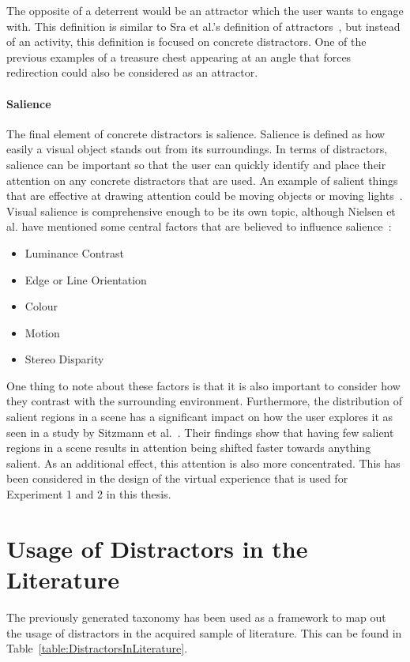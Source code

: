 The opposite of a deterrent would be an attractor which the user wants to engage with. This definition is similar to Sra et al.'s definition of attractors~\cite{sra2018vmotion}, but instead of an activity, this definition is focused on concrete distractors. One of the previous examples of a treasure chest appearing at an angle that forces redirection could also be considered as an attractor. 

\paragraph{Salience}
The final element of concrete distractors is salience. Salience is defined as how easily a visual object stands out from its surroundings. In terms of distractors, salience can be important so that the user can quickly identify and place their attention on any concrete distractors that are used. An example of salient things that are effective at drawing attention could be moving objects or moving lights~\cite{rothe2018guiding}. 
Visual salience is comprehensive enough to be its own topic, although Nielsen et al. have mentioned some central factors that are believed to influence salience~\cite{nielsen2016missing}:
\begin{itemize}
    \item Luminance Contrast
    \item Edge or Line Orientation
    \item Colour
    \item Motion
    \item Stereo Disparity
\end{itemize}
One thing to note about these factors is that it is also important to consider how they contrast with the surrounding environment. Furthermore, the distribution of salient regions in a scene has a significant impact on how the user explores it as seen in a study by Sitzmann et al.~\cite{sitzmann2018saliency}. Their findings show that having few salient regions in a scene results in attention being shifted faster towards anything salient. As an additional effect, this attention is also more concentrated. This has been considered in the design of the virtual experience that is used for Experiment 1 and 2 in this thesis.

\section{Usage of Distractors in the Literature}\label{sec:distractorUsageInLiterature}
The previously generated taxonomy has been used as a framework to map out the usage of distractors in the acquired sample of literature. This can be found in Table~\ref{table:DistractorsInLiterature}.

